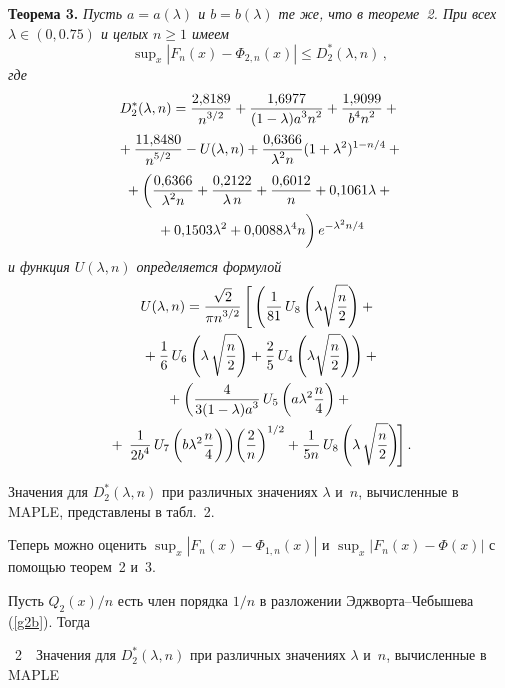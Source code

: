 \begin{multicols}{2}
\noindent
\textbf{Теорема 3.} \textit{Пусть $a=a(\lambda) $ и $b=b(\lambda) $  те же, что в теореме~2. 
При всех $\lambda \in (0,0.75)$  и целых $n\geq 1$ имеем
$$
\sup\nolimits_x \left\vert F_n(x) - \Phi_{2,n}(x)\right\vert \leq D_2^*(\lambda, n)\,, 
$$
где
\begin{multline*}
D_2^*(\lambda, n) = \fr{2{,}8189}{n^{3/2}}+\fr{1{,}6977}{ (1-\lambda)a^3n^2} +
\fr{1{,}9099}{b^4n^2}+{}\\
{}+\fr{11{,}8480}{n^{5/2}} -U(\lambda,n)
+\fr{0{,}6366}{\lambda^2 n} (1+\lambda^2)^{1-n/4}
+{}\\
{}+\left(\fr{0{,}6366}{\lambda^2 n}+
\fr{0{,}2122}{\lambda \,n}+
\fr{0{,}6012 }{n}+ 0{,}1061\lambda + {}\right.\\
\left.{}+0{,}1503 \lambda^2 +0{,}0088 \lambda^4 n
\vphantom{\fr{0{,}}{0{,}}}\right)e^{-\lambda^2 n/4}
\end{multline*}
и функция $U(\lambda,n)$ определяется формулой}
\begin{multline*} %
 U(\lambda,n)  = \fr{\sqrt{2}}{\pi n^{3/2}}\left[ 
 \vphantom{\left(\fr{1}{2}\right)^1}
 \left(\fr{1}{81}\,U_8\left(\lambda \sqrt{\fr{n}{2}}\right) + {}\right.\right.\\
\left. {}+
 \fr{1}{6}\, U_6\left(\lambda\,\sqrt{\fr{n}{2}}\right) + \fr{2}{5}\, U_4\left(\lambda \sqrt{\fr{n}{2}}\right) \right)+{}\\
{} + \left(\fr{4}{3(1-\lambda)a^3}\, U_5\left(a\lambda^2 \fr{n}{4}\right) + {}\right.\\
{}+\left.\left.\fr{1}{2b^4}\, 
U_7\left(b \lambda^2 \fr{n}{4}\right)\right)\!\left(\fr{2}{n}\right)^{1/2} 
+ \fr{1}{5 n}\, U_8\left(\lambda\,\sqrt{\fr{n}{2}}\right) \!\right].
\end{multline*}

Значения для $D_2^*(\lambda,n)$ при различных значениях  $\lambda$ и~$n$, вычисленные в    MAPLE,
представлены в табл.~2.



Теперь можно оценить   $\sup\nolimits_x \left\vert F_n(x) - \Phi_{1,n}(x)\right\vert$ и 
$\sup\nolimits_x \left\vert F_n(x) - \Phi(x)\right\vert$ с помощью теорем~2 и~3.   

Пусть $Q_2(x)/n$ есть член порядка   $1/n$ в разложении Эджворта--Чебышева (\ref{g2b}). Тогда

\columnbreak


\noindent
\begin{center}
\parbox{56mm}{{\tablename~2}\ \ \small{Значения для 
$D_2^*(\lambda,n)$ при различных значениях  $\lambda$ и~$n$, вычисленные в    MAPLE}}


\end{center}
\end{multicols}

